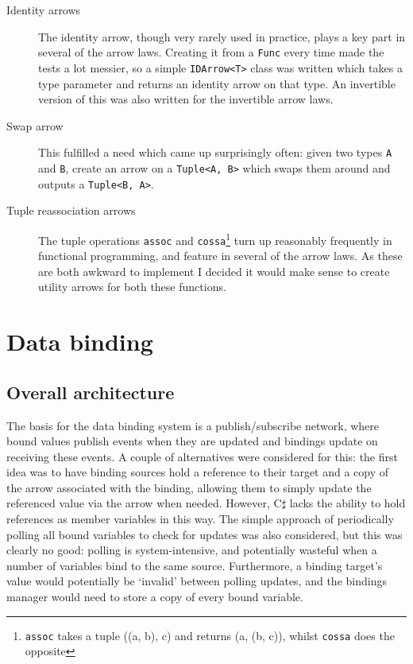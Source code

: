 \documentclass[12pt,twoside,notitlepage]{report}
\begin{document}
\begin{description}
	\item[Identity arrows] The identity arrow, though very rarely used in practice, plays a key part in several of the arrow laws. Creating it from a \texttt{Func} every time made the tests a lot messier, so a simple \texttt{IDArrow<T>} class was written which takes a type parameter and returns an identity arrow on that type. An invertible version of this was also written for the invertible arrow laws.
	\item[Swap arrow] This fulfilled a need which came up surprisingly often: given two types \texttt{A} and \texttt{B}, create an arrow on a \texttt{Tuple<A, B>} which swaps them around and outputs a \texttt{Tuple<B, A>}.
	\item[Tuple reassociation arrows] The tuple operations \texttt{assoc} and \texttt{cossa}\footnote{\texttt{assoc} takes a tuple ((a, b), c) and returns (a, (b, c)), whilst \texttt{cossa} does the opposite} turn up reasonably frequently in functional programming, and feature in several of the arrow laws. As these are both awkward to implement I decided it would make sense to create utility arrows for both these functions.
\end{description}




\section{Data binding}

\subsection{Overall architecture}

The basis for the data binding system is a publish/subscribe network, where bound values publish events when they are updated and bindings update on receiving these events. A couple of alternatives were considered for this: the first idea was to have binding sources hold a reference to their target and a copy of the arrow associated with the binding, allowing them to simply update the referenced value via the arrow when needed. However, C$\sharp$ lacks the ability to hold references as member variables in this way. The simple approach of periodically polling all bound variables to check for updates was also considered, but this was clearly no good: polling is system-intensive, and potentially wasteful when a number of variables bind to the same source. Furthermore, a binding target's value would potentially be `invalid' between polling updates, and the bindings manager would need to store a copy of every bound variable.
\end{document}

